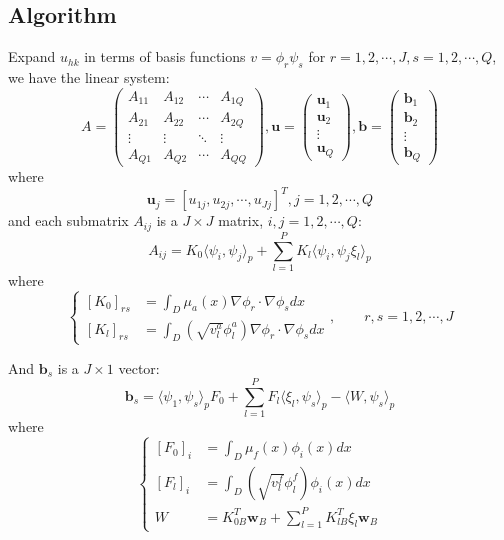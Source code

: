 \subsection{Algorithm}
Expand $u_{hk}$ in terms of basis functions $v = \phi_r \psi_s$ for $r=1,2,\cdots, J, s=1,2,\cdots, Q$, we have the linear system:
\begin{equation}
    A = \begin{pmatrix}
        A_{11} & A_{12} & \cdots & A_{1Q}\\
        A_{21} & A_{22} & \cdots & A_{2Q}\\
        \vdots & \vdots & \ddots & \vdots\\
        A_{Q1} & A_{Q2} & \cdots & A_{QQ}
    \end{pmatrix},
    \mathbf{u} = \begin{pmatrix}
        \mathbf{u}_1\\
        \mathbf{u}_2\\
        \vdots\\
        \mathbf{u}_Q
    \end{pmatrix},
    \mathbf{b} = \begin{pmatrix}
        \mathbf{b}_1\\
        \mathbf{b}_2\\
        \vdots\\
        \mathbf{b}_Q
    \end{pmatrix}
\end{equation}
where
\begin{equation}
    \mathbf{u}_j = [u_{1j}, u_{2j}, \cdots, u_{Jj}]^T, j=1,2,\cdots, Q
\end{equation}
and each submatrix $A_{ij}$ is a $J\times J$ matrix, $i,j=1,2,\cdots, Q$:
\begin{equation}
    A_{ij} = K_0\langle \psi_i, \psi_j\rangle_p + \sum_{l=1}^{P}K_l\langle \psi_i, \psi_j\xi_l\rangle_p
\end{equation}
where
\begin{equation}\left\{
    \begin{aligned}
        \left[K_0\right]_{rs} &= \int_D \mu_a(x)\nabla\phi_r\cdot \nabla\phi_sdx\\
        \left[K_l\right]_{rs} &= \int_D (\sqrt{v_l^a}\phi_l^a)\nabla\phi_r\cdot \nabla\phi_sdx
    \end{aligned}\right., \qquad r,s=1,2,\cdots, J
\end{equation}

And $\mathbf{b}_s$ is a $J\times 1$ vector:
\begin{equation}
    \mathbf{b}_s = \langle \psi_1, \psi_s\rangle_pF_0 + \sum_{l=1}^{P}F_l\langle \xi_l, \psi_s\rangle_p - \langle W, \psi_s\rangle_p
\end{equation}
where
\begin{equation}\left\{
    \begin{aligned}
        \left[F_0\right]_{i} &= \int_D \mu_f(x)\phi_i(x)dx\\
        \left[F_l\right]_{i} &= \int_D (\sqrt{v_l^f}\phi_l^f)\phi_i(x)dx\\
        W &= K^T_{0B}\mathbf{w}_B+\sum_{l=1}^{P}K^T_{lB}\xi_l\mathbf{w}_B
    \end{aligned}\right.
\end{equation}

